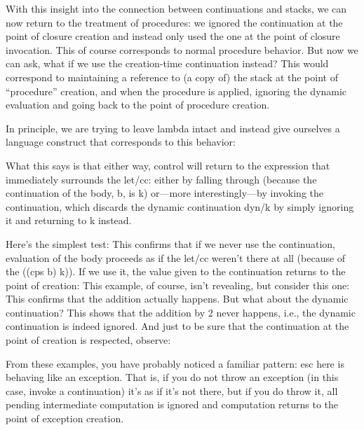 \secdown

With this insight into the connection between continuations and stacks, we can
now return to the treatment of procedures: we ignored the continuation at the
point of closure creation and instead only used the one at the point of closure
invocation. This of course corresponds to normal procedure behavior. But now we
can ask, what if we use the creation-time continuation instead? This would
correspond to maintaining a reference to (a copy of) the stack at the point of
“procedure” creation, and when the procedure is applied, ignoring the dynamic
evaluation and going back to the point of procedure creation.

In principle, we are trying to leave lambda intact and instead give ourselves a
language construct that corresponds to this behavior:

What this says is that either way, control will return to the expression that
immediately surrounds the let/cc: either by falling through (because the
continuation of the body, b, is k) or—more interestingly—by invoking the
continuation, which discards the dynamic continuation dyn/k by simply ignoring
it and returning to k instead.

Here’s the simplest test:
This confirms that if we never use the continuation, evaluation of the body
proceeds as if the let/cc weren’t there at all (because of the ((cps b) k)). If
we use it, the value given to the continuation returns to the point of creation:
This example, of course, isn’t revealing, but consider this one:
This confirms that the addition actually happens. But what about the dynamic
continuation?
This shows that the addition by 2 never happens, i.e., the dynamic continuation
is indeed ignored. And just to be sure that the continuation at the point of
creation is respected, observe:

From these examples, you have probably noticed a familiar pattern: esc here is
behaving like an exception. That is, if you do not throw an exception (in this
case, invoke a continuation) it’s as if it’s not there, but if you do throw it,
all pending intermediate computation is ignored and computation returns to the
point of exception creation.


